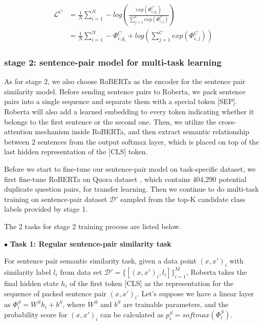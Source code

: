 \documentclass[letterpaper]{article} %
\begin{document}
  \begin{equation}
    \begin{aligned}
      \mathcal{L}^{C}&=\frac{1}{N}\sum_{i=1}^{N}-log(\frac{exp(\varPhi_{i,y_{i}}^C)}{\sum_{j=1}^{C}exp(\varPhi_{i,j}^C)}) \\&=\frac{1}{N}\sum_{i=1}^{N}-\varPhi_{i,y_{i}}^C+log(\sum_{j=1}^{C}exp(\varPhi_{i,j}^C))
      \label{eq:classification loss}
    \end{aligned}
  \end{equation}

  \subsubsection*{
    stage 2: sentence-pair model for multi-task learning
  }

  As for  stage 2, we also choose RoBERTa as the encoder for the sentence pair similarity model. Before sending sentence pairs to Roberta, we
  pack  sentence  pairs  into a single sequence and separate them with a special
  token  [SEP].  Roberta  will  also  add  a  learned  embedding  to every token
  indicating  whether  it belongs to the first sentence or the second one. Then,
  we  utilize  the  cross-attention  mechanism  inside RoBERTa, and then extract
  semantic relationship between 2 sentences from the output softmax layer, which
  is placed on top of the last hidden representation of the [CLS] token.

  Before we start to fine-tune our sentence-pair model on task-specific dataset,
  we   first  fine-tune  RoBERTa  on  Quora  dataset \cite{iyer2017first},  which
  contains  404,290  potential  duplicate question pairs, for transfer learning.
  Then   we   continue  to  do  multi-task  training  on  sentence-pair  dataset
  $\mathcal{D'}$ sampled from the top-K candidate class labels provided by stage
  1.

  The 2 tasks for stage 2 training process are listed below.

  $\bullet$ \textbf{Task 1: Regular sentence-pair similarity task}

  For  sentence  pair semantic similarity task, given a data point $(x, x')_{i}$
  with       similarity       label       $l_{i}$       from       data      set
  $\mathcal{D'}=\{[(x,x')_{i},l_{i}]\}_{i=1}^{M}$,   Roberta   takes  the  final
  hidden  state  $h_{i}$  of the first token [CLS] as the representation for the
  sequence of packed sentence pair $(x, x')_{i}$. Let's suppose we have a linear
  layer  as  ${\Phi}^S_{i}=W^Sh_{i}+b^S$,  where  $W^S$  and $b^S$ are trainable
  parameters,  and  the probability score for $(x, x')_{i}$ can be calculated as
  $p^S_{i}=softmax({\Phi}^S_{i})$.
\end{document}
